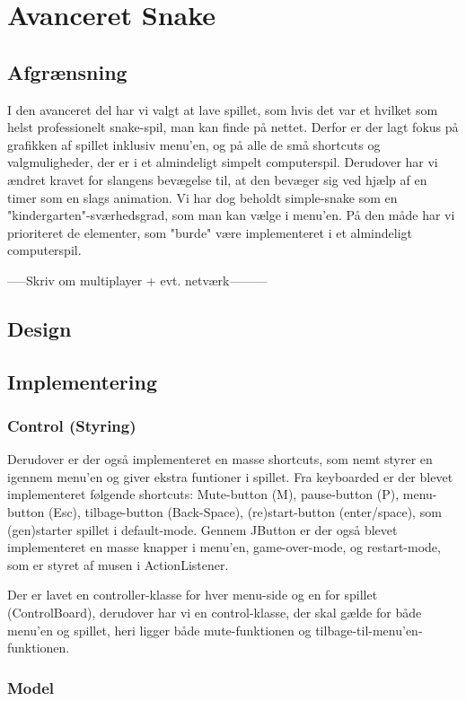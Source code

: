 \documentclass{report}
\begin{document}
\chapter{Avanceret Snake}
\section{Afgrænsning}
I den avanceret del har vi valgt at lave spillet, som hvis det var et hvilket som helst professionelt snake-spil, man kan finde på nettet. Derfor er der lagt fokus på grafikken af spillet inklusiv menu'en, og på alle de små shortcuts og valgmuligheder, der er i et almindeligt simpelt computerspil. Derudover har vi ændret kravet for slangens bevægelse til, at den bevæger sig ved hjælp af en timer som en slags animation. Vi har dog beholdt simple-snake som en "kindergarten"-sværhedsgrad, som man kan vælge i menu'en.
På den måde har vi prioriteret de elementer, som "burde" være implementeret i et almindeligt computerspil. 

-----Skriv om multiplayer + evt. netværk---------
\section{Design}

\section{Implementering}

\subsection{Control (Styring)}
Derudover er der også implementeret en masse shortcuts, som nemt styrer en igennem menu'en og giver ekstra funtioner i spillet. Fra keyboarded er der blevet implementeret følgende shortcuts: Mute-button (M), pause-button (P), menu-button (Esc), tilbage-button (Back-Space), (re)start-button (enter/space), som (gen)starter spillet i default-mode.
Gennem JButton er der også blevet implementeret en masse knapper i menu'en, game-over-mode, og restart-mode, som er styret af musen i ActionListener.

Der er lavet en controller-klasse for hver menu-side og en for spillet (ControlBoard), derudover har vi en control-klasse, der skal gælde for både menu'en og spillet, heri ligger både mute-funktionen og tilbage-til-menu'en-funktionen.

\subsection{Model}
\end{document}

